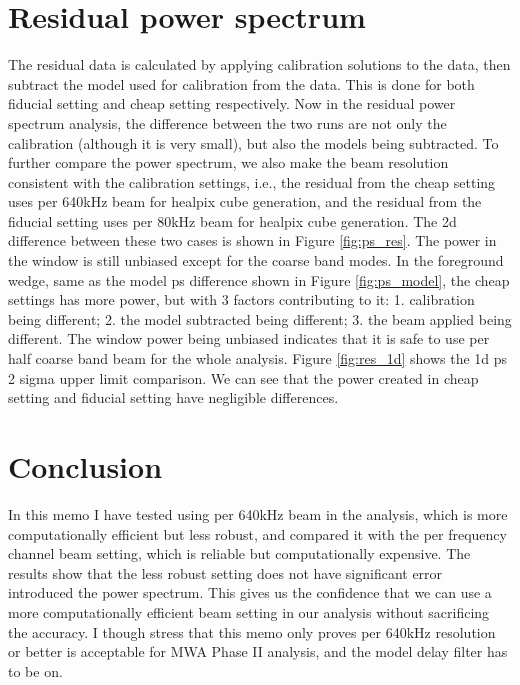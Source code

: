 \documentclass[10pt]{extarticle}
\begin{document}
\section{Residual power spectrum}
The residual data is calculated by applying calibration solutions to the data, then subtract the model used for calibration from the data. This is done for both fiducial setting and cheap setting respectively. Now in the residual power spectrum analysis, the difference between the two runs are not only the calibration (although it is very small), but also the models being subtracted. To further compare the power spectrum, we also make the beam resolution consistent with the calibration settings, i.e., the residual from the cheap setting uses per 640kHz beam for healpix cube generation, and the residual from the fiducial setting uses per 80kHz beam for healpix cube generation. The 2d difference between these two cases is shown in Figure \ref{fig:ps_res}. The power in the window is still unbiased except for the coarse band modes. In the foreground wedge, same as the model ps difference shown in Figure \ref{fig:ps_model}, the cheap settings has more power, but with 3 factors contributing to it: 1. calibration being different; 2. the model subtracted being different; 3. the beam applied being different. The window power being unbiased indicates that it is safe to use per half coarse band beam for the whole analysis. Figure \ref{fig:res_1d} shows the 1d ps 2 sigma upper limit comparison. We can see that the power created in cheap setting and fiducial setting have negligible differences. 

\section{Conclusion}
In this memo I have tested using per 640kHz beam in the analysis, which is more computationally efficient but less robust, and compared it with the per frequency channel beam setting, which is reliable but computationally expensive. The results show that the less robust setting does not have significant error introduced the power spectrum. This gives us the confidence that we can use a more computationally efficient beam setting in our analysis without sacrificing the accuracy. I though stress that this memo only proves per 640kHz resolution or better is acceptable for MWA Phase II analysis, and the model delay filter has to be on. 
\end{document}
